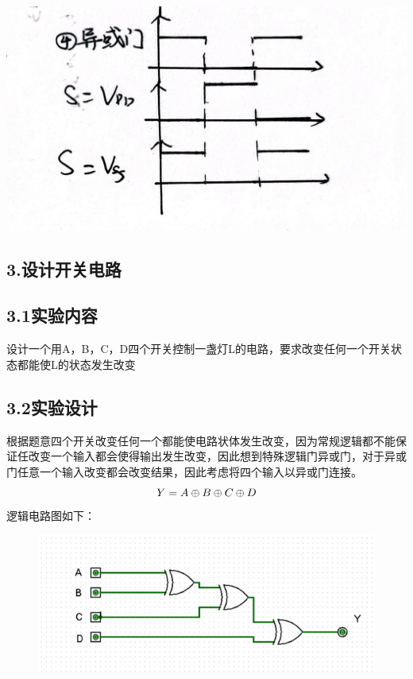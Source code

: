 \documentclass{ctexart}
\begin{document}
    \begin{minipage}[c]{0.4\textwidth}
        \centering
        \includegraphics[width=1\linewidth]{3.2.4.JPG} 
    \end{minipage}
    
    \subsection*{3.设计开关电路}
    \subsection*{3.1实验内容}
    设计一个用A，B，C，D四个开关控制一盏灯L的电路，要求改变任何一个开关状态都能使L的状态发生改变
    \subsection*{3.2实验设计}
    根据题意四个开关改变任何一个都能使电路状体发生改变，因为常规逻辑都不能保证任改变一个输入都会使得输出发生改变，因此想到特殊逻辑门异或门，对于异或门任意一个输入改变都会改变结果，因此考虑将四个输入以异或门连接。
    \begin{equation}
        Y=A\oplus B\oplus C\oplus D\notag
    \end{equation}
    逻辑电路图如下：
    \begin{figure}[htbp]
        \centering
        \includegraphics[width=15cm]{3.3.1.png}
    \end{figure}
\end{document}
